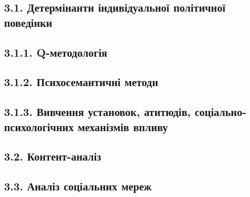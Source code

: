 \documentclass[
  10pt,
  a5paper,
  DIV=11,
  numbers=noendperiod]{scrreprt}
\begin{document}

\subsection*{3.1. Детермінанти індивідуальної політичної
поведінки}\label{ux434ux435ux442ux435ux440ux43cux456ux43dux430ux43dux442ux438-ux456ux43dux434ux438ux432ux456ux434ux443ux430ux43bux44cux43dux43eux457-ux43fux43eux43bux456ux442ux438ux447ux43dux43eux457-ux43fux43eux432ux435ux434ux456ux43dux43aux438}

\subsection*{3.1.1.
Q-методологія}\label{q-ux43cux435ux442ux43eux434ux43eux43bux43eux433ux456ux44f}

\subsection*{3.1.2. Психосемантичні
методи}\label{ux43fux441ux438ux445ux43eux441ux435ux43cux430ux43dux442ux438ux447ux43dux456-ux43cux435ux442ux43eux434ux438}

\subsection*{3.1.3. Вивчення установок, атитюдів,
соціально-психологічних механізмів
впливу}\label{ux432ux438ux432ux447ux435ux43dux43dux44f-ux443ux441ux442ux430ux43dux43eux432ux43eux43a-ux430ux442ux438ux442ux44eux434ux456ux432-ux441ux43eux446ux456ux430ux43bux44cux43dux43e-ux43fux441ux438ux445ux43eux43bux43eux433ux456ux447ux43dux438ux445-ux43cux435ux445ux430ux43dux456ux437ux43cux456ux432-ux432ux43fux43bux438ux432ux443}

\subsection*{3.2.
Контент-аналіз}\label{ux43aux43eux43dux442ux435ux43dux442-ux430ux43dux430ux43bux456ux437}

\subsection*{3.3. Аналіз соціальних
мереж}\label{ux430ux43dux430ux43bux456ux437-ux441ux43eux446ux456ux430ux43bux44cux43dux438ux445-ux43cux435ux440ux435ux436}
\end{document}

